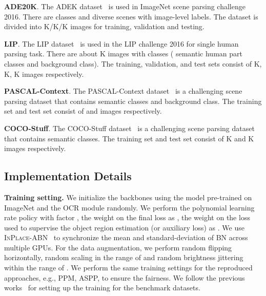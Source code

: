 \documentclass[runningheads]{llncs}
\newcommand{\bnInplaceSync}{\textsc{InPlace-ABN}\xspace}
\begin{document}
\noindent\textbf{ADE20K}.
The ADEK dataset~\cite{zhou2017scene} is used in ImageNet scene parsing challenge 2016.
There are  classes and diverse scenes with  image-level labels.
The dataset is divided into K/K/K images for training, validation and testing. 

\noindent\textbf{LIP}.
The LIP dataset~\cite{Gong_2017_CVPR} is used in the LIP challenge 2016 for single human parsing task. 
There are about K images with  classes ( semantic human part classes and  background class).
The training, validation, and test sets consist of 
K, K, K images respectively.

\noindent\textbf{PASCAL-Context}.
The PASCAL-Context dataset~\cite{mottaghi2014role} is a challenging
scene parsing dataset that contains  semantic
classes and  background class. 
The training set and test set consist of
 and  images respectively.

\noindent\textbf{COCO-Stuff}.
The COCO-Stuff dataset~\cite{caesar2018coco} is a challenging
scene parsing dataset that contains  semantic
classes. 
The training set and test set consist of
K and K images respectively.

\subsection{Implementation Details}

\noindent\textbf{Training setting.}
We initialize the backbones
using the model pre-trained on ImageNet
and the OCR module randomly.
We perform the polynomial learning rate policy with factor , the weight on the final loss as , the weight on the loss used to supervise the object region estimation (or auxiliary loss) as .
We use \bnInplaceSync~\cite{Bulo_2018_CVPR} to synchronize the mean and standard-deviation of BN across multiple GPUs.
For the data augmentation, we perform random flipping horizontally, random scaling in the range of  and random brightness jittering within the range of .
We perform the same training settings for the reproduced approaches, e.g., PPM, ASPP, to ensure the fairness.
We follow the previous works~\cite{chen2017rethinking,Zhang_2018_CVPR,zhao2017pyramid} 
for setting up the training
for the benchmark datasets.
\end{document}
